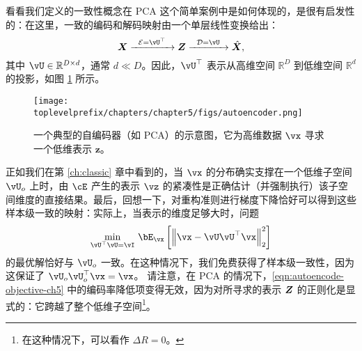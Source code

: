\documentclass[../../book-main.tex]{subfiles}
\begin{document}
看看我们定义的一致性概念在 PCA 这个简单案例中是如何体现的，是很有启发性的：在这里，一致的编码和解码映射由一个单层线性变换给出：
\begin{equation}
  \X \xrightarrow{\hspace{2mm} \mathcal{E} = \vU^\top \hspace{2mm}}
  \Z \xrightarrow{\hspace{2mm} \mathcal{D} = \vU \hspace{2mm}}   \hat{\X},
  \label{eqn:autoencoding-PCA-2}
\end{equation}
其中 $\vU \in \mathbb{R}^{D\times d}$，通常 $d\ll D$。因此，$\vU^\top$ 表示从高维空间 $\mathbb{R}^{D}$ 到低维空间 $\mathbb{R}^{d}$ 的投影，如图 \ref{fig:AE} 所示。
\begin{figure}
  \centering \texttt{[image: \\toplevelprefix/chapters/chapter5/figs/autoencoder.png]}
  \caption{一个典型的自编码器（如 PCA）的示意图，它为高维数据 $\vx$ 寻求一个低维表示 $\bm{z}$。}
  \label{fig:AE}
\end{figure}

正如我们在第 \ref{ch:classic} 章中看到的，当 $\vx$ 的分布确实支撑在一个低维子空间 $\vU_o$ 上时，由 $\cE$ 产生的表示 $\vz$ 的紧凑性是正确估计（并强制执行）该子空间维度的直接结果。最后，回想一下，对重构准则进行梯度下降恰好可以得到这些样本级一致的映射：实际上，当表示的维度足够大时，问题
\begin{equation}\label{eq:pca-reconstruction-ch5}
  \min_{\vU^\top \vU = \vI}\, \bE_{\vx}\left[\norm*{\vx
  - \vU\vU^\top \vx}_2^2\right]
\end{equation}
的最优解恰好与 $\vU_o$ 一致。在这种情况下，我们免费获得了样本级一致性，因为这保证了 $\vU_o\vU_o^\top \vx = \vx$。
请注意，在 PCA 的情况下，\eqref{eqn:autoencode-objective-ch5} 中的编码率降低项变得无效，因为对所寻求的表示 $\bm{Z}$ 的正则化是显式的：它跨越了整个低维子空间\footnote{在这种情况下，可以看作 $\Delta R = 0$。}。
\end{document}
